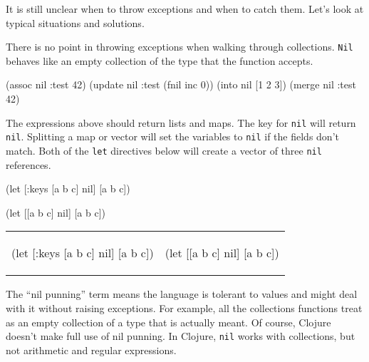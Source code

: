 It is still unclear when to throw exceptions and when to catch them. Let's look at typical situations and solutions.

There is no point in throwing exceptions when walking through collections. \verb|Nil| behaves like an empty collection of the type that the function accepts.

\begin{clojure}
(assoc nil :test 42)
(update nil :test (fnil inc 0))
(into nil [1 2 3])
(merge nil {:test 42})
\end{clojure}

\noindent
The expressions above should return lists and maps. The key for \verb|nil| will return \verb|nil|. Splitting a map or vector will set the variables to \verb|nil| if the fields don't match. Both of the \verb|let| directives below will create a vector of three \verb|nil| references.

\ifnarrow

\begin{clojure}
(let [{:keys [a b c]} nil]
  [a b c])
\end{clojure}

\splitter

\begin{clojure}
(let [[a b c] nil]
  [a b c])
\end{clojure}

\else

\noindent
\begin{tabular}{ @{}p{5cm} @{}p{5cm} }

\begin{clojure}
(let [{:keys [a b c]} nil]
  [a b c])
\end{clojure}

&

\begin{clojure}
(let [[a b c] nil]
  [a b c])
\end{clojure}

\end{tabular}

\fi


The ``nil punning'' term means the language is tolerant to  values and might deal with it without raising exceptions. For example, all the collections functions treat  as an empty collection of a type that is actually meant. Of course, Clojure doesn't make full use of nil punning. In Clojure, \verb|nil| works with collections, but not arithmetic and regular expressions.


